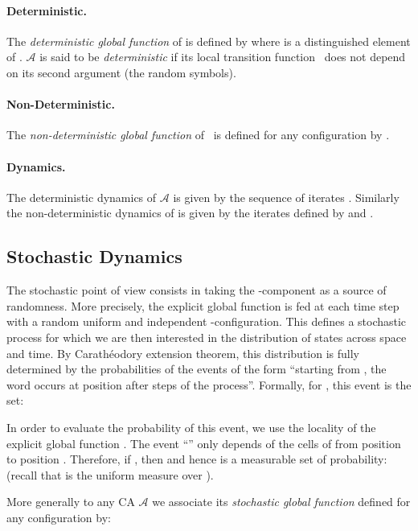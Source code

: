 \documentclass[submission]{fundam}
\newcommand{\AUTO}[1]{{\ensuremath{\mathcal{#1}}}}
\newcommand\CAA{\AUTO A}
\begin{document}
\paragraph{Deterministic.}  The \emph{deterministic global function}  of  is  defined by  where  is a distinguished element of . \CAA{}  is said to be \emph{deterministic} if its local transition function~ does not depend on its second argument (the random symbols).

\paragraph{Non-Deterministic.} The \emph{non-deterministic global function}  of~ is  defined for any configuration  by 
.

\paragraph{Dynamics.} The deterministic dynamics of \CAA{} is given by the sequence of iterates . Similarly the non-deterministic dynamics of  is given by the iterates  defined by  and . 


\subsection{Stochastic Dynamics}
\label{sec:stochdyn}

 The stochastic point of view consists in taking the -component as a source of randomness. More precisely, the explicit global function  is fed at each time step with a
random uniform and independent -configuration. This defines a stochastic process for which we are then interested in the distribution of states across space and time. By Carath\'eodory extension theorem, this distribution is fully determined by the probabilities of the events of the form  ``starting from , the word  occurs at position  after  steps of the process''.
Formally, for , this event is the set:

In order to evaluate the probability of this event, we use the locality of the explicit global function . The event ``'' only depends of the cells of  from position  to position . Therefore, if , then  and hence  is a measurable set of probability:  (recall that  is the uniform measure over ).



More generally to  any CA \CAA{} we associate its \emph{stochastic global function}  defined for any configuration  by: 
 
\end{document}
